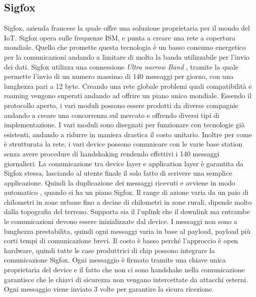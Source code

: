 \subsection{Sigfox}
Sigfox, azienda francese la quale offre una soluzione proprietaria per il mondo
del IoT. Sigfox opera sulle frequenze ISM, e punta a creare una rete a copertura
mondiale. Quello che promette questa tecnologia è un basso consumo energetico
per la comunicazioni andando a limitare di molto la banda utilizzabile per
l'invio dei dati. Sigfox utilizza una connessione \emph{Ultra narrow Band} ,
tramite la quale permette l'invio di un numero massimo di 140 messaggi per
giorno, con una lunghezza pari a 12 byte. Creando una rete globale problemi
quali compatibilità e roaming vengono superati andando ad offrire un piano unico
mondiale. Essendo il protocollo aperto, i vari moduli possono essere prodotti da
diverse compagnie andando a creare una concorrenza sul mercato e offrendo
diversi tipi di implementazione. I vari moduli sono disegnati per funzionare con
tecnologie già esistenti, andando a ridurre in maniera drastica il costo
unitario. Inoltre per come è strutturata la rete, i vari device possono
comunicare con le varie base station senza avere procedure di handshaking
rendendo effettivi i 140 messaggi giornalieri. La comunicazione tra device layer
e application layer è garantita da Sigfox stessa, lasciando al utente finale il
solo fatto di scrivere una semplice applicazione. Quindi la duplicazione dei
messaggi ricevuti e avviene in modo automatico , quando si ha un piano Sigfox.
Il range di azione varia da un paio di chilometri in zone urbane fino a decine 
di chilometri in zone rurali, dipende molto dalla topografia del terreno.
Supporta sia il l'uplink che il downlink ma entrambe le comunicazioni devono
essere inizializzate dal device. I messaggi non sono a lunghezza prestabilita,
quindi ogni messaggi varia in base al payload, payload più corti tempi di
comunicazione brevi. Il costo è basso perché l'approccio è open hardware, quindi
tutte le case produttrici di chip possono integrare la comunicazione Sigfox.
Ogni messaggio è firmato tramite una chiave unica proprietaria del device e il
fatto che non ci sono handshake nella comunicazione garantisce che le chiavi di
sicurezza non vengano intercettate da attacchi esterni. Ogni messaggio viene
inviato 3 volte per garantire la sicura ricezione. 
